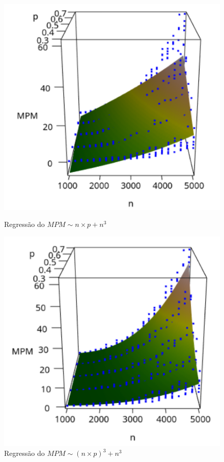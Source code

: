\documentclass{uofa-eng-assignment}
\begin{document}
\begin{figure}[h]
    \centering
    \begin{minipage}{0.45\textwidth}
        \centering
        \includegraphics[width=1\textwidth]{plot3d_mpm.png}
        \caption{Regressão do $MPM \sim n \times p + n^3$}
        \label{fig:plot3d-mpm}
    \end{minipage}
    \hfill
    \begin{minipage}{0.45\textwidth}
        \centering
        \includegraphics[width=1\textwidth]{plot3d_mpm_2.png}
        \caption{Regressão do $MPM \sim (n \times p)^3 + n^3$}
        \label{fig:plot3d-mpm-2}
    \end{minipage}
\end{figure}
\end{document}
